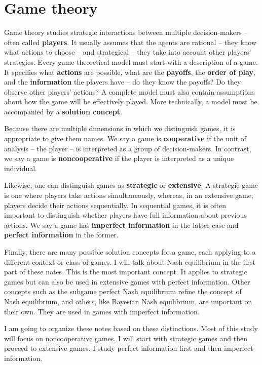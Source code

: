 \documentclass[../../main.tex]{subfiles}
\begin{document}
\section{Game theory}
\label{GTheory_I}
Game theory studies strategic interactions between multiple decision-makers -- often called \textbf{players}. It usually assumes that the agents are rational -- they know what actions to choose -- and strategical -- they take into account other players' strategies. Every game-theoretical model must start with a description of a game. It specifies what \textbf{actions} are possible, what are the \textbf{payoffs}, the \textbf{order of play}, and the \textbf{information} the players have -- do they know the payoffs? Do they observe other players' actions? A complete model must also contain assumptions about how the game will be effectively played. More technically, a model must be accompanied by a \textbf{solution concept}.

Because there are multiple dimensions in which we distinguish games, it is appropriate to give them names. We say a game is \textbf{cooperative} if the unit of analysis -- the player -- is interpreted as a group of decision-makers. In contrast, we say a game is \textbf{noncooperative} if the player is interpreted as a unique individual. 

Likewise, one can distinguish games as \textbf{strategic} or \textbf{extensive}. A strategic game is one where players take actions simultaneously, whereas, in an extensive game, players decide their actions sequentially. In sequential games, it is often important to distinguish whether players have full information about previous actions. We say a game has \textbf{imperfect information} in the latter case and \textbf{perfect information} in the former.

Finally, there are many possible solution concepts for a game, each applying to a different context or class of games. I will talk about Nash equilibrium in the first part of these notes. This is the most important concept. It applies to strategic games but can also be used in extensive games with perfect information. Other concepts such as the subgame perfect Nash equilibrium refine the concept of Nash equilibrium, and others, like Bayesian Nash equilibrium, are important on their own. They are used in games with imperfect information.

I am going to organize these notes based on these distinctions. Most of this study will focus on noncooperative games. I will start with strategic games and then proceed to extensive games. I study perfect information first and then imperfect information.
\end{document}
